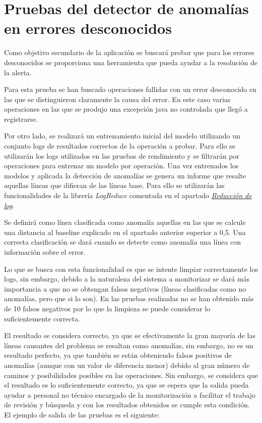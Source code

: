 \section{Pruebas del detector de anomalías en errores desconocidos}

Como objetivo secundario de la aplicación se buscará probar que para los errores desconocidos se proporciona una herramienta que pueda ayudar a la resolución de la alerta.

Para esta prueba se han buscado operaciones fallidas con un error desconocido en las que se distinguieron claramente la causa del error. En este caso varias operaciones en las que se produjo una excepción java no controlada que llegó a registrarse.

Por otro lado, se realizará un entrenamiento inicial del modelo utilizando un conjunto logs de resultados correctos de la operación a probar. Para ello se utilizarán los logs utilizados en las pruebas de rendimiento y se filtrarán por operaciones para entrenar un modelo por operación. Una vez entrenados los modelos y aplicada la detección de anomalías se genera un informe que resalte aquellas líneas que difieran de las líneas base. Para ello se utilizarán las funcionalidades de la librería \textit{LogReduce} comentada en el apartado \hyperref[sec:log_reduction]{\textit{Reducción de log}}.

Se definirá como línea clasificada como anomalía aquellas en las que se calcule una distancia al baseline explicado en el apartado anterior superior a 0,5. Una correcta clasificación se dará cuando se detecte como anomalía una línea con información sobre el error. 

Lo que se busca con esta funcionalidad es que se intente limpiar correctamente los logs, sin embargo, debido a la naturaleza del sistema a monitorizar se dará más importancia a que no se obtengan falsos negativos (líneas clasificadas como no anomalías, pero que si lo son). En las pruebas realizadas no se han obtenido más de 10 falsos negativos por lo que la limpieza se puede considerar lo suficientemente correcta. 

El resultado se considera correcto, ya que se efectivamente la gran mayoría de las líneas causantes del problema se resaltan como anomalías, sin embargo, no es un resultado perfecto, ya que también se están obteniendo falsos positivos de anomalías (aunque con un valor de diferencia menor) debido al gran número de caminos y posibilidades posibles en las operaciones. Sin embargo, se considera que el resultado es lo suficientemente correcto, ya que se espera que la salida pueda ayudar a personal no técnico encargado de la monitorización a facilitar el trabajo de revisión y búsqueda y con los resultados obtenidos se cumple esta condición. El ejemplo de salida de las pruebas es el siguiente:

